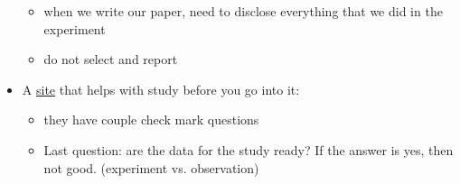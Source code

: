 \begin{itemize}
\begin{itemize}
        \item when we write our paper, need to disclose everything that we did in the experiment 
        \item do not select and report
    \end{itemize}
    \item A \href{https://aspredicted.org/}{site} that helps with study before you go into it:
    \begin{itemize}
        \item they have couple check mark questions
        \item Last question: are the data for the study ready? If the answer is yes, then not good. (experiment vs. observation)
    \end{itemize}
\end{itemize}

